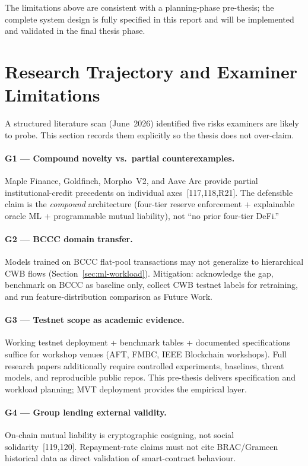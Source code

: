 \documentclass[12pt,a4paper]{report}
\begin{document}
The limitations above are consistent with a planning-phase pre-thesis; the complete system design is fully specified in this report and will be implemented and validated in the final thesis phase.

\section{Research Trajectory and Examiner Limitations}
\label{sec:research-limitations}

A structured literature scan (June~2026) identified five risks examiners are likely to probe. This section records them explicitly so the thesis does not over-claim.

\paragraph{G1 --- Compound novelty vs.\ partial counterexamples.}
Maple Finance, Goldfinch, Morpho~V2, and Aave Arc provide partial institutional-credit precedents on individual axes~[117,118,R21]. The defensible claim is the \textit{compound} architecture (four-tier reserve enforcement + explainable oracle ML + programmable mutual liability), not ``no prior four-tier DeFi.''

\paragraph{G2 --- BCCC domain transfer.}
Models trained on BCCC flat-pool transactions may not generalize to hierarchical CWB flows (Section~\ref{sec:ml-workload}). Mitigation: acknowledge the gap, benchmark on BCCC as baseline only, collect CWB testnet labels for retraining, and run feature-distribution comparison as Future Work.

\paragraph{G3 --- Testnet scope as academic evidence.}
Working testnet deployment + benchmark tables + documented specifications suffice for workshop venues (AFT, FMBC, IEEE Blockchain workshops). Full research papers additionally require controlled experiments, baselines, threat models, and reproducible public repos. This pre-thesis delivers specification and workload planning; MVT deployment provides the empirical layer.

\paragraph{G4 --- Group lending external validity.}
On-chain mutual liability is cryptographic cosigning, not social solidarity~[119,120]. Repayment-rate claims must not cite BRAC/Grameen historical data as direct validation of smart-contract behaviour.
\end{document}
